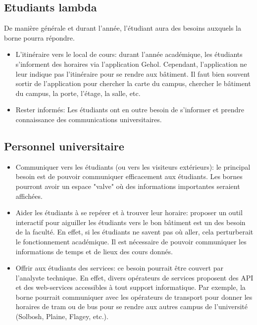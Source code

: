 \subsection{Etudiants lambda}
De manière générale et durant l'année, l'étudiant aura des besoins auxquels la borne pourra répondre. 
\begin{itemize}
 
\item L'itinéraire vers le local de cours: durant l'année académique, les étudiants s'informent des horaires via l'application Gehol. Cependant, l'application ne leur indique pas l'itinéraire pour se rendre aux bâtiment. Il faut bien souvent sortir de l'application pour chercher la carte du campus, chercher le bâtiment du campus, la porte, l'étage, la salle, etc. 
\item Rester informés: Les étudiants ont en outre besoin de s'informer et prendre connaissance des communications universitaires.
\end{itemize}


\subsection{Personnel universitaire}
\begin{itemize}
    \item Communiquer vers les étudiants (ou vers les visiteurs extérieurs): le principal besoin est de pouvoir communiquer efficacement aux étudiants. Les bornes pourront avoir un espace "valve" où des informations importantes seraient affichées.


\item {Aider les étudiants à se repérer et à trouver leur horaire}: proposer un outil interactif pour aiguiller les étudiants vers le bon bâtiment est un des besoin de la faculté. En effet, si les étudiants ne savent pas où aller, cela perturberait le fonctionnement académique. Il est nécessaire de pouvoir communiquer les informations de temps et de lieux des cours donnés. 


\item {Offrir aux étudiants des services}: ce besoin pourrait être couvert par l'analyste technique. En effet, divers opérateurs de services proposent des API et des web-services accessibles à tout support informatique. Par exemple, la borne pourrait communiquer avec les opérateurs de transport pour donner les horaires de tram ou de bus pour se rendre aux autres campus de l'université (Solbosh, Plaine, Flagey, etc.). 
\end{itemize}



